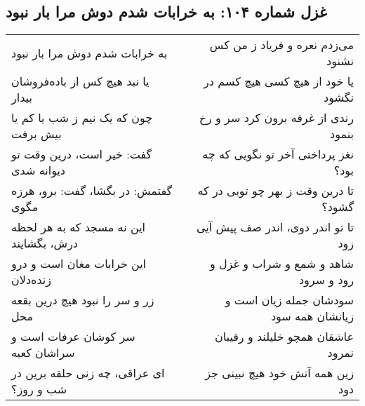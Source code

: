 \begin{center}
\section*{غزل شماره ۱۰۴: به خرابات شدم دوش مرا بار نبود}
\label{sec:104}
\begin{longtable}{l p{0.5cm} r}
به خرابات شدم دوش مرا بار نبود
&&
می‌زدم نعره و فریاد ز من کس نشنود
\\
یا نبد هیچ کس از باده‌فروشان بیدار
&&
یا خود از هیچ کسی هیچ کسم در نگشود
\\
چون که یک نیم ز شب یا کم یا بیش برفت
&&
رندی از غرفه برون کرد سر و رخ بنمود
\\
گفت: خیر است، درین وقت تو دیوانه شدی
&&
نغز پرداختی آخر تو نگویی که چه بود؟
\\
گفتمش: در بگشا، گفت: برو، هرزه مگوی
&&
تا درین وقت ز بهر چو تویی در که گشود؟
\\
این نه مسجد که به هر لحظه درش، بگشایند
&&
تا تو اندر دوی، اندر صف پیش آیی زود
\\
این خرابات مغان است و درو زنده‌دلان
&&
شاهد و شمع و شراب و غزل و رود و سرود
\\
زر و سر را نبود هیچ درین بقعه محل
&&
سودشان جمله زیان است و زیانشان همه سود
\\
سر کوشان عرفات است و سراشان کعبه
&&
عاشقان همچو خلیلند و رقیبان نمرود
\\
ای عراقی، چه زنی حلقه برین در شب و روز؟
&&
زین همه آتش خود هیچ نبینی جز دود
\\
\end{longtable}
\end{center}
